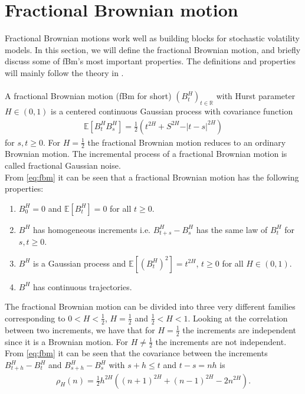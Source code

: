 \documentclass{article}
\begin{document}
\section{Fractional Brownian motion}
Fractional Brownian motions work well as building blocks for stochastic volatility models. In this section, we will define the fractional Brownian motion, and briefly discuss some of fBm's most important properties. The definitions and properties will mainly follow the theory in \cite{biagini2008}.\\\\ 
A fractional Brownian motion (fBm for short) $(B_t^H)_{t\in\mathbb{R}}$ with Hurst parameter $H\in(0,1)$ is a centered continuous Gaussian process with covariance function
\begin{align}
\mathbb{E}\left[B_t^HB_s^H\right] = \frac{1}{2}\left(t^{2H}+S^{2H}-\vert t-s\vert ^{2H} \right) \label{eq:fbm}
\end{align}
for $s,t\geq 0$. For $H = \frac{1}{2}$ the fractional Brownian motion reduces to an ordinary Brownian motion. The incremental process of a fractional Brownian motion is called fractional Gaussian noise.\\
From \eqref{eq:fbm} it can be seen that a fractional Brownian motion has the following properties:
\begin{enumerate}
    \item $B_0^H = 0$ and $\mathbb{E}[B^H_t] = 0$ for all $t\geq 0$.
    \item $B^H$ has homogeneous increments i.e. $B^H_{t+s}-B^H_s$ has the same law of $B^H_t$ for $s,t\geq0$.
    \item $B^H$ is a Gaussian process and $\mathbb{E}[(B^H_t)^2]=t^{2H}$, $t\geq 0$ for all $H\in (0,1)$.
    \item $B^H$ has continuous trajectories.
\end{enumerate}
The fractional Brownian motion can be divided into three very different families corresponding to $0<H<\frac{1}{2}$, $H=\frac{1}{2}$ and $\frac{1}{2}<H<1$. Looking at the correlation between two increments, we have that for $H=\frac{1}{2}$ the increments are independent since it is a Brownian motion. For $H\neq \frac{1}{2}$ the increments are not independent. From \eqref{eq:fbm} it can be seen that the covariance between the increments $B^H_{t+h}-B^H_{t}$ and $B^H_{s+h}-B^H_{s}$ with $s+h\leq t$ and $t-s=nh$ is
\begin{align*}
\rho_H(n) = \frac{1}{2}h^{2H} \left( (n+1)^{2H} +(n-1)^{2H} -2n^{2H}\right).
\end{align*}
\end{document}
